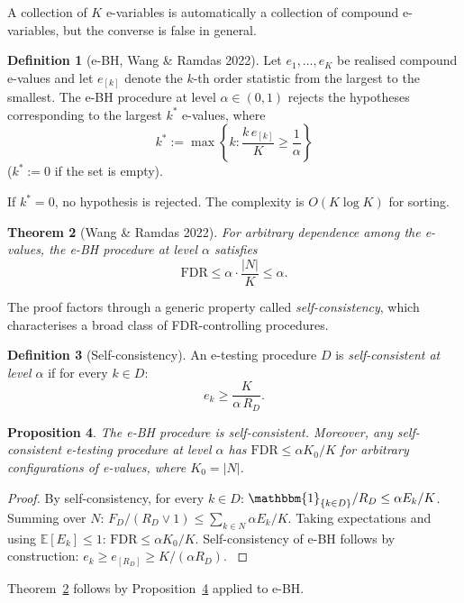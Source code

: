 \documentclass[11pt,a4paper,twocolumn]{article}
\theoremstyle{plain}
\newtheorem{theorem}{Theorem}[section]
\newtheorem{proposition}[theorem]{Proposition}
\theoremstyle{definition}
\newtheorem{definition}[theorem]{Definition}
\theoremstyle{remark}
\newcommand{\E}{\mathbb{E}}
\newcommand{\ind}{\mathbbm{1}}
\newcommand{\FDR}{\mathrm{FDR}}
\begin{document}
A collection of $K$ e-variables is automatically a collection of compound
e-variables, but the converse is false in general.

\begin{definition}[e-BH, Wang \& Ramdas 2022]
Let $e_1, \ldots, e_K$ be realised compound e-values and let $e_{[k]}$ denote
the $k$-th order statistic from the largest to the smallest. The e-BH
procedure at level $\alpha \in (0,1)$ rejects the hypotheses corresponding to
the largest $k^*$ e-values, where
\[
  k^* := \max\!\left\{k : \frac{k\,e_{[k]}}{K} \geq \frac{1}{\alpha}\right\}
\]
($k^* := 0$ if the set is empty).
\end{definition}

If $k^* = 0$, no hypothesis is rejected. The
complexity is $O(K \log K)$ for sorting.

\begin{theorem}[Wang \& Ramdas 2022]\label{thm:ebh}
For arbitrary dependence among the e-values, the e-BH procedure at level
$\alpha$ satisfies
\[
  \FDR \leq \alpha \cdot \frac{|N|}{K} \leq \alpha.
\]
\end{theorem}

The proof factors through a generic property called \emph{self-consistency},
which characterises a broad class of FDR-controlling procedures.

\begin{definition}[Self-consistency]
An e-testing procedure $D$ is \emph{self-consistent at level $\alpha$} if for
every $k \in D$:
\[
  e_k \geq \frac{K}{\alpha\,R_D}.
\]
\end{definition}

\begin{proposition}\label{prop:sc}
The e-BH procedure is self-consistent. Moreover, any self-consistent
e-testing procedure at level $\alpha$ has $\FDR \leq \alpha K_0 / K$ for
arbitrary configurations of e-values, where $K_0 = |N|$.
\end{proposition}

\begin{proof}{\small
By self-consistency, for every $k \in D$:
$\ind_{\{k \in D\}}/R_D \leq \alpha E_k/K$.
Summing over $N$: $F_D/(R_D\vee 1) \leq \sum_{k\in N}\alpha E_k/K$.
Taking expectations and using $\E[E_k]\leq 1$:
$\FDR \leq \alpha K_0/K$.
Self-consistency of e-BH follows by construction: $e_k \geq e_{[R_D]} \geq K/(\alpha R_D)$.
}\end{proof}

Theorem~\ref{thm:ebh} follows by Proposition~\ref{prop:sc} applied to e-BH.
\end{document}
